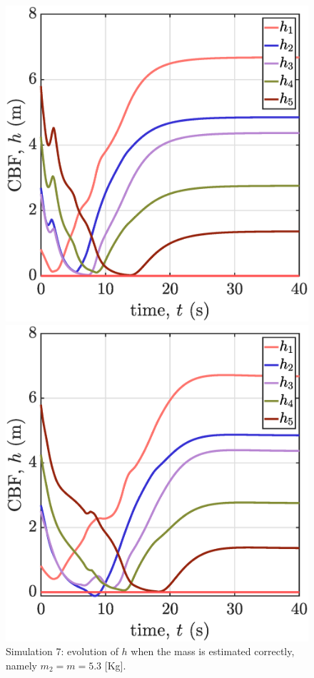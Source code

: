 \begin{figure}[p]
    \begin{minipage}[b]{0.45\linewidth}
    \includegraphics[width=\textwidth]{figures/sim7hm.eps}
    \caption{\label{fig:sim7hm}Simulation 7: evolution of $h$ when the mass is estimated correctly, namely $m_2=m=5.3$ [Kg].}
    \end{minipage}
    \hfill
    \begin{minipage}[b]{0.45\linewidth}
    \includegraphics[width=\textwidth]{figures/sim7h3.eps}

\end{minipage}
\end{figure}
